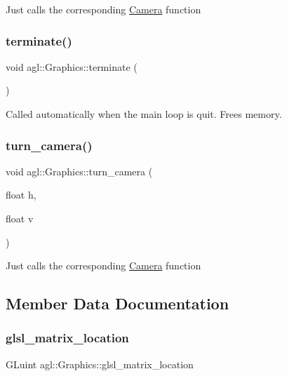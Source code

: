 Just calls the corresponding \mbox{\hyperlink{classagl_1_1Camera}{Camera}} function \mbox{\label{classagl_1_1Graphics_a2c277530c365b51dd3516f6feb4b767b}} 
\subsubsection{\texorpdfstring{terminate()}{terminate()}}
{\footnotesize\ttfamily void agl\+::\+Graphics\+::terminate (\begin{DoxyParamCaption}{ }\end{DoxyParamCaption})}

Called automatically when the main loop is quit. Frees memory. \mbox{\label{classagl_1_1Graphics_a0dad176d86f738aac92182f6212c1a5a}} 
\subsubsection{\texorpdfstring{turn\_camera()}{turn\_camera()}}
{\footnotesize\ttfamily void agl\+::\+Graphics\+::turn\+\_\+camera (\begin{DoxyParamCaption}\item[{float}]{h,  }\item[{float}]{v }\end{DoxyParamCaption})}

Just calls the corresponding \mbox{\hyperlink{classagl_1_1Camera}{Camera}} function 

\subsection{Member Data Documentation}
\mbox{\label{classagl_1_1Graphics_a3550ce001ca87a37911808dcf2b41757}} 
\subsubsection{\texorpdfstring{glsl\_matrix\_location}{glsl\_matrix\_location}}
{\footnotesize\ttfamily G\+Luint agl\+::\+Graphics\+::glsl\+\_\+matrix\+\_\+location\hspace{0.3cm}{\ttfamily [private]}}

